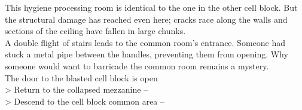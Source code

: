 This hygiene processing room is identical to the one in the other cell block. But the structural damage has reached even here; cracks race along the walls and sections of the ceiling have fallen in large chunks.\\

A double flight of stairs leads to the common room’s entrance. Someone had stuck a metal pipe between the handles, preventing them from opening. Why someone would want to barricade the common room remains a mystery.\\
 The door to the blasted cell block is open\\

> Return to the collapsed mezzanine -- \\
> Descend to the cell block common area -- 